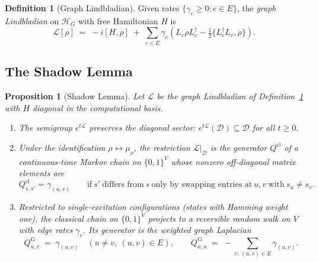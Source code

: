 \documentclass[11pt,letterpaper]{article}
\newtheorem{proposition}{Proposition}
\theoremstyle{definition}
\newtheorem{definition}{Definition}
\theoremstyle{remark}
\newcommand{\Lind}{\mathcal{L}}
\newcommand{\Hil}{\mathcal{H}}
\newcommand{\Diag}{\mathcal{D}}
\newcommand{\edge}[2]{(#1,#2)}
\begin{document}
\begin{definition}[Graph Lindbladian]
\label{def:graph_lind}
Given rates $\{\gamma_e \ge 0 : e \in E\}$, the \emph{graph Lindbladian}
on $\Hil_G$ with free Hamiltonian $H$ is
\begin{equation}
\Lind[\rho] \;=\; -i[H,\rho]
\;+\; \sum_{e \in E} \gamma_e\!
   \left( L_e\rho L_e^\dagger - \tfrac{1}{2}\{L_e^\dagger L_e,\rho\}\right).
\label{eq:graph_lind}
\end{equation}
\end{definition}

\subsection{The Shadow Lemma}

\begin{proposition}[Shadow Lemma]
\label{prop:shadow}
Let $\Lind$ be the graph Lindbladian of Definition~\ref{def:graph_lind} with
$H$ diagonal in the computational basis.
\begin{enumerate}[leftmargin=1.4em,itemsep=2pt,topsep=2pt]
\item[(a)] The semigroup $e^{t\Lind}$ preserves the diagonal sector:
   $e^{t\Lind}(\Diag) \subseteq \Diag$ for all $t \ge 0$.
\item[(b)] Under the identification $\rho \leftrightarrow \mu_\rho$, the
   restriction $\Lind|_{\Diag}$ is the generator $Q^{\mathrm{cl}}$ of a
   continuous-time Markov chain on $\{0,1\}^V$ whose nonzero off-diagonal
   matrix elements are
\begin{equation}
Q^{\mathrm{cl}}_{s,s'} = \gamma_{\edge{u}{v}}
   \qquad \text{if}\ s'\ \text{differs from}\ s\ \text{only by
   swapping entries at}\ u,v\ \text{with}\ s_u \ne s_v.
\label{eq:Qcl}
\end{equation}
\item[(c)] Restricted to single-excitation configurations (states with
   Hamming weight one), the classical chain on $\{0,1\}^V$ projects to a
   reversible random walk on $V$ with edge rates $\gamma_e$. Its generator is
   the weighted graph Laplacian
\begin{equation}
Q^{\mathrm{G}}_{u,v}
   \;=\; \gamma_{\edge{u}{v}} \quad (u\ne v,\ \edge{u}{v}\in E),
\qquad
Q^{\mathrm{G}}_{u,u}
   \;=\; -\sum_{v:\,\edge{u}{v}\in E} \gamma_{\edge{u}{v}}.
\label{eq:Qgraph}
\end{equation}
\end{enumerate}
\end{proposition}
\end{document}
